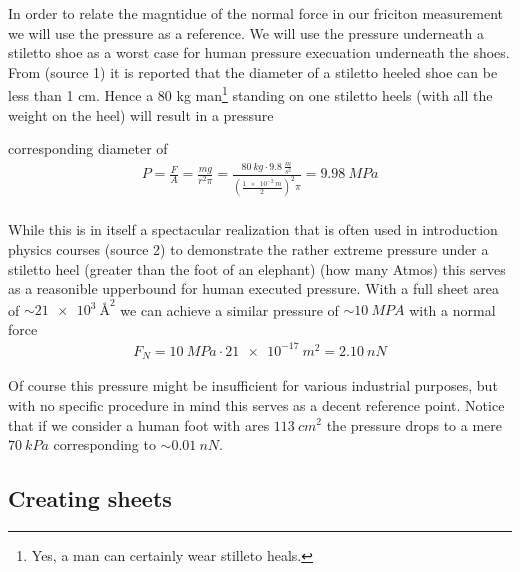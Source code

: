 
In order to relate the magntidue of the normal force in our friciton measurement we will use the pressure as a reference. We will use the pressure underneath a stiletto shoe as a worst case for human pressure execuation underneath the shoes. From (source 1) it is reported that the diameter of a stiletto heeled shoe can be less than 1 cm. Hence a 80 kg man\footnote{Yes, a man can certainly wear stilleto heals.} standing on one stiletto heels (with all the weight on the heel) will result in a pressure

corresponding diameter of 
\begin{align*}
  P = \frac{F}{A} = \frac{mg}{r^2\pi} = \frac{\SI{80}{kg} \cdot \SI{9.8}{\frac{m}{s^2}}}{(\frac{\SI{1e-2}{m}}{2})^2 \pi} = \SI{9.98}{MPa} \\
\end{align*} 

While this is in itself a spectacular realization that is often used in introduction physics courses (source 2) to demonstrate the rather extreme pressure under a stiletto heel (greater than the foot of an elephant) (how many Atmos) this serves as a reasonible upperbound for human executed pressure. With a full sheet area of $\sim\SI{21e3}{Å^2}$ we can achieve a similar pressure of $\sim \SI{10}{MPA}$ with a normal force 
\begin{align*}
  F_N = \SI{10}{MPa} \cdot \SI{21e-17}{m^2} = \SI{2.10}{nN}  
\end{align*}

Of course this pressure might be insufficient for various industrial purposes, but with no specific procedure in mind this serves as a decent reference point. Notice that if we consider a human foot with ares $\SI{113}{cm^2}$ the pressure drops to a mere $\SI{70}{kPa}$ corresponding to $\sim \SI{0.01}{nN}$.



\subsection{Creating sheets}

